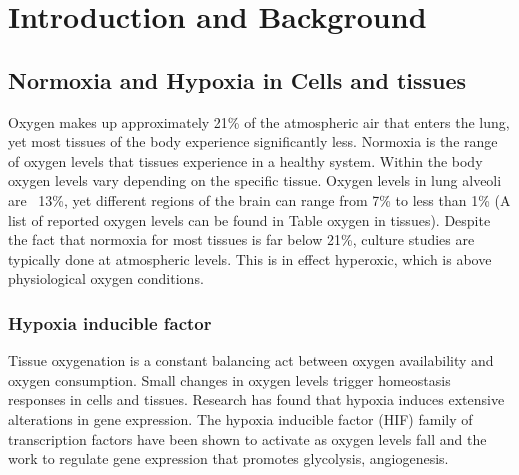 
\chapter{Introduction and Background} %

\label{Chapter1} %



\section{Normoxia and Hypoxia in Cells and tissues}

Oxygen makes up approximately 21\% of the atmospheric air that enters the lung, yet most tissues of the body experience significantly less.
Normoxia is the range of oxygen levels that tissues experience in a healthy system.
Within the body oxygen levels vary depending on the specific tissue.
Oxygen levels in lung alveoli are ~13\%, yet different regions of the brain can range from 7\% to less than 1\% (A list of reported oxygen levels can be found in Table oxygen in tissues).
Despite the fact that normoxia for most tissues is far below 21\%, culture studies are typically done at atmospheric levels. This is in effect hyperoxic, which is above physiological oxygen conditions.

\subsection{Hypoxia inducible factor}

Tissue oxygenation is a constant balancing act between oxygen availability and oxygen consumption.
Small changes in oxygen levels trigger homeostasis responses in cells and tissues.
Research has found that hypoxia induces extensive alterations in gene expression.
The hypoxia inducible factor (HIF) family of transcription factors have been shown to activate as oxygen levels fall and the work to regulate gene expression that promotes glycolysis, angiogenesis.
 

